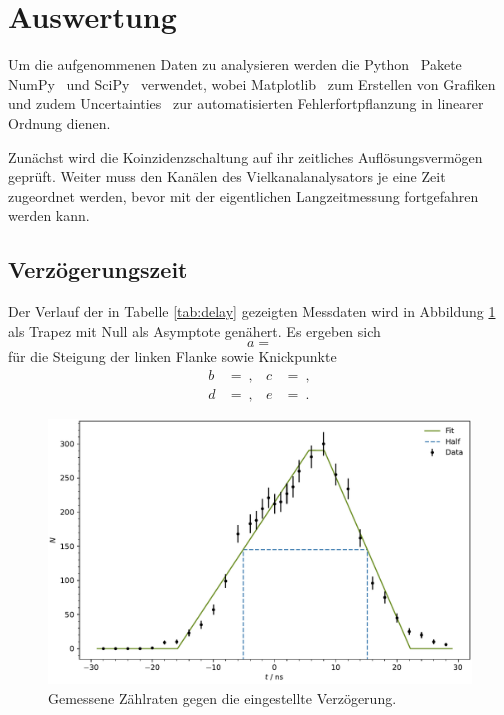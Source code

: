 \newpage
\section{Auswertung}

Um die aufgenommenen Daten zu analysieren werden die Python~\cite{python} Pakete NumPy~\cite{numpy} und SciPy~\cite{scipy} verwendet,
wobei Matplotlib~\cite{matplotlib} zum Erstellen von Grafiken und zudem Uncertainties~\cite{uncertainties} zur automatisierten
Fehlerfortpflanzung in linearer Ordnung dienen.

Zunächst wird die Koinzidenzschaltung auf ihr zeitliches Auflösungsvermögen geprüft. Weiter muss den Kanälen des Vielkanalanalysators
je eine Zeit zugeordnet werden, bevor mit der eigentlichen Langzeitmessung fortgefahren werden kann.



\subsection{Verzögerungszeit}

Der Verlauf der in Tabelle \ref{tab:delay} gezeigten Messdaten wird in Abbildung \ref{fig:delay} als Trapez mit Null als Asymptote
genähert. Es ergeben sich
\begin{equation*}
	a = 
\end{equation*}
für die Steigung der linken Flanke sowie Knickpunkte
\begin{align*}
	b &=  \: , & c &=  \: , \\
	d &=  \: , & e &=  \: .
\end{align*}

\begin{figure}[H]
	\centering
	\includegraphics[width=\textwidth]{build/delay.pdf}
	\caption{Gemessene Zählraten gegen die eingestellte Verzögerung.}
	\label{fig:delay}
\end{figure}

